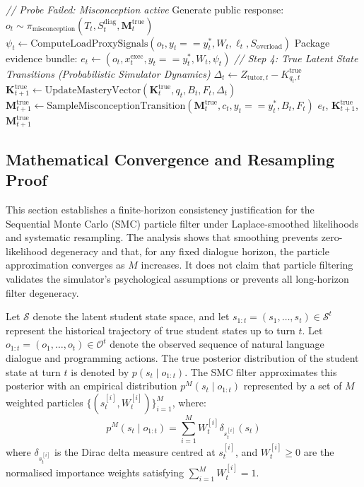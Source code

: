 \documentclass[11pt,a4paper]{report}
\begin{document}
\begin{algorithm}[p]
\begin{algorithmic}[1]
    \Else
        \State \textit{// Probe Failed: Misconception active}
        \State Generate public response: $o_t \sim \pi_{\text{misconception}}(T_t, S_t^{\text{diag}}, \mathbf{M}_t^{\text{true}})$
    \EndIf
\EndIf
\State $\psi_t \gets
    \text{ComputeLoadProxySignals}(o_t,y_t==y_t^*,W_t,\ell_t,S_{\text{overload}})$
\State Package evidence bundle:
       $e_t\gets(o_t,x_t^{\text{exec}},y_t==y_t^*,W_t,\psi_t)$
\State \textit{// Step 4: True Latent State Transitions (Probabilistic Simulator Dynamics)}
\State $\Delta_t \gets Z_{\text{tutor},t}-K^{\text{true}}_{q_t,t}$
\State $\mathbf{K}_{t+1}^{\text{true}} \gets
    \text{UpdateMasteryVector}(\mathbf{K}_t^{\text{true}},q_t,B_t,F_t,\Delta_t)$
\State $\mathbf{M}_{t+1}^{\text{true}} \gets
    \text{SampleMisconceptionTransition}(\mathbf{M}_t^{\text{true}},c_t,y_t==y_t^*,B_t,F_t)$
\State \Return $e_t$, $\mathbf{K}_{t+1}^{\text{true}}$, $\mathbf{M}_{t+1}^{\text{true}}$
\end{algorithmic}
\end{algorithm}

\subsection{Mathematical Convergence and Resampling Proof}
This section establishes a finite-horizon consistency justification for the Sequential Monte Carlo (SMC) particle filter under Laplace-smoothed likelihoods and systematic resampling. The analysis shows that smoothing prevents zero-likelihood degeneracy and that, for any fixed dialogue horizon, the particle approximation converges as $M$ increases. It does not claim that particle filtering validates the simulator's psychological assumptions or prevents all long-horizon filter degeneracy.

Let $\mathcal{S}$ denote the latent student state space, and let $s_{1:t} = (s_1, \dots, s_t) \in \mathcal{S}^t$ represent the historical trajectory of true student states up to turn $t$. Let $o_{1:t} = (o_1, \dots, o_t) \in \mathcal{O}^t$ denote the observed sequence of natural language dialogue and programming actions. The true posterior distribution of the student state at turn $t$ is denoted by $p(s_t \mid o_{1:t})$. The SMC filter approximates this posterior with an empirical distribution $p^M(s_t \mid o_{1:t})$ represented by a set of $M$ weighted particles $\{ (s_t^{[i]}, W_t^{[i]}) \}_{i=1}^M$, where:
\begin{equation}
    p^M(s_t \mid o_{1:t}) = \sum_{i=1}^M W_t^{[i]} \delta_{s_t^{[i]}}(s_t)
\end{equation}
where $\delta_{s_t^{[i]}}$ is the Dirac delta measure centred at $s_t^{[i]}$, and $W_t^{[i]} \ge 0$ are the normalised importance weights satisfying $\sum_{i=1}^M W_t^{[i]} = 1$.
\end{document}
